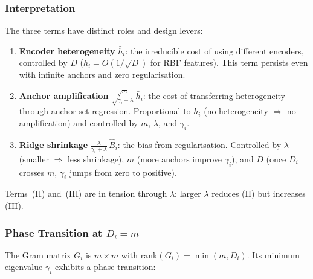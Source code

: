 \subsubsection{Interpretation}

The three terms have distinct roles and design levers:

\begin{enumerate}[label=\textbf{(\Roman*)}]
    \item \textbf{Encoder heterogeneity} $\bar{h}_i$:
    the irreducible cost of using different encoders,
    controlled by $D$
    ($\bar{h}_i = O(1/\sqrt{D})$ for RBF features).
    This term persists even with infinite anchors
    and zero regularisation.

    \item \textbf{Anchor amplification}
    $\frac{\sqrt{m}}{\sqrt{\gamma_i+\lambda}}\,
    \bar{h}_i$:
    the cost of transferring heterogeneity through
    anchor-set regression. Proportional to $\bar{h}_i$
    (no heterogeneity $\Rightarrow$ no amplification)
    and controlled by $m$, $\lambda$, and $\gamma_i$.

    \item \textbf{Ridge shrinkage}
    $\frac{\lambda}{\gamma_i+\lambda}\,\hat{B}_i$:
    the bias from regularisation.
    Controlled by $\lambda$ (smaller $\Rightarrow$
    less shrinkage), $m$ (more anchors improve
    $\gamma_i$), and $D$ (once $D_i$ crosses $m$,
    $\gamma_i$ jumps from zero to positive).
\end{enumerate}

Terms~(II) and~(III) are in tension through $\lambda$:
larger $\lambda$ reduces (II) but increases (III).

\subsubsection{Phase Transition at $D_i = m$}

The Gram matrix $G_i$ is $m \times m$ with
$\mathrm{rank}(G_i) = \min(m, D_i)$.
Its minimum eigenvalue $\gamma_i$ exhibits a
phase transition:

